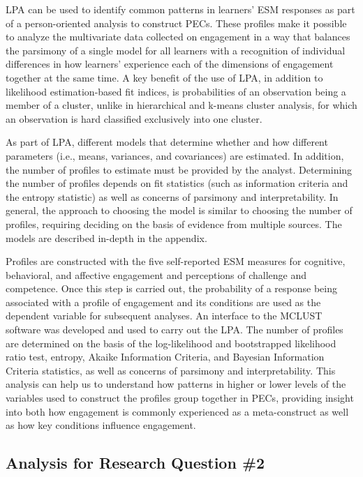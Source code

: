 \documentclass[]{msu-thesis}
\theoremstyle{definition}
\theoremstyle{definition}
\theoremstyle{definition}
\theoremstyle{remark}
\begin{document}
LPA can be used to identify common patterns in learners' ESM responses
as part of a person-oriented analysis to construct PECs. These profiles
make it possible to analyze the multivariate data collected on
engagement in a way that balances the parsimony of a single model for
all learners with a recognition of individual differences in how
learners' experience each of the dimensions of engagement together at
the same time. A key benefit of the use of LPA, in addition to
likelihood estimation-based fit indices, is probabilities of an
observation being a member of a cluster, unlike in hierarchical and
k-means cluster analysis, for which an observation is hard classified
exclusively into one cluster.

As part of LPA, different models that determine whether and how
different parameters (i.e., means, variances, and covariances) are
estimated. In addition, the number of profiles to estimate must be
provided by the analyst. Determining the number of profiles depends on
fit statistics (such as information criteria and the entropy statistic)
as well as concerns of parsimony and interpretability. In general, the
approach to choosing the model is similar to choosing the number of
profiles, requiring deciding on the basis of evidence from multiple
sources. The models are described in-depth in the appendix.

Profiles are constructed with the five self-reported ESM measures for
cognitive, behavioral, and affective engagement and perceptions of
challenge and competence. Once this step is carried out, the probability
of a response being associated with a profile of engagement and its
conditions are used as the dependent variable for subsequent analyses.
An interface to the MCLUST software was developed and used to carry out
the LPA. The number of profiles are determined on the basis of the
log-likelihood and bootstrapped likelihood ratio test, entropy, Akaike
Information Criteria, and Bayesian Information Criteria statistics, as
well as concerns of parsimony and interpretability. This analysis can
help us to understand how patterns in higher or lower levels of the
variables used to construct the profiles group together in PECs,
providing insight into both how engagement is commonly experienced as a
meta-construct as well as how key conditions influence engagement.

\subsection{Analysis for Research Question
\#2}\label{analysis-for-research-question-2}
\end{document}
